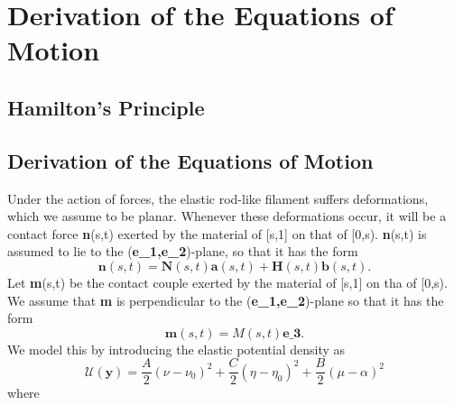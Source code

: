 \documentclass[12pt]{article}
\newcommand{\cB}{B}
\newcommand{\cA}{A}
\newcommand{\cC}{C}
\begin{document}
\section{Derivation of the Equations of Motion
}\label{Derivation of the Equations of Motion
}
\subsection{Hamilton's Principle}
\subsection{Derivation of the Equations of Motion}
Under the action of forces, the elastic rod-like filament suffers deformations, which we assume to be planar. Whenever these deformations occur, it will be a contact force \textbf{n}(s,t) exerted by the material of [s,1] on that of [0,s). \textbf{n}(s,t) is assumed to lie to the (\textbf{e_1,e_2})-plane, so that it has the form
\[  \textbf{n}(s,t)= \textbf{N} (s,t) \textbf{a}(s,t) + \textbf{H} (s,t) \textbf{b} (s,t).
\]
Let \textbf{m}(s,t) be the contact couple exerted by the material of [s,1] on tha of [0,s). We assume that \textbf{m} is perpendicular to the (\textbf{e_1,e_2})-plane so that it has the form
\[ 
\textbf{m}(s,t) = M(s,t)\textbf{e_3}.
\]
We model this by introducing the elastic potential density as
\[ \mathcal{U}(\textbf{y}) = \frac{\cA}{2} (\nu - \nu_0)^2
+\frac{\cC}{2} (\eta - \eta_0 )^2
+\frac{\cB}{2} (\mu -\alpha)^2 
\]
where
\end{document}
